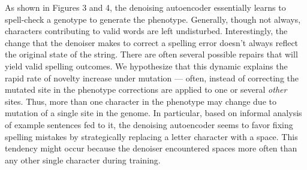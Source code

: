 As shown in Figures 3 and 4, the denoising autoencoder essentially learns to spell-check a genotype to generate the phenotype.
Generally, though not always, characters contributing to valid words are left undisturbed.
Interestingly, the change that the denoiser makes to correct a spelling error doesn't always reflect the original state of the string.
There are often several possible repairs that will yield valid spelling outcomes.
We hypothesize that this dynamic explains the rapid rate of novelty increase under mutation --- often, instead of correcting the mutated site in the phenotype corrections are applied to one or several \textit{other} sites.
Thus, more than one character in the phenotype may change due to mutation of a single site in the genome.
In particular, based on informal analysis of example sentences fed to it, the denoising autoencoder seems to favor fixing spelling mistakes by strategically replacing a letter character with a space.
This tendency might occur because the denoiser encountered spaces more often than any other single character during training.
